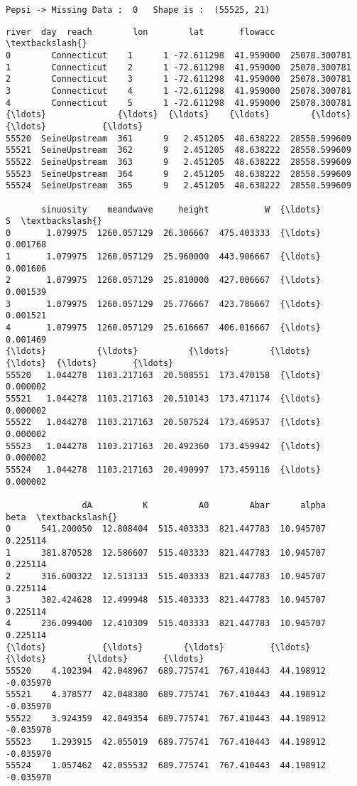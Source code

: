 \documentclass[11pt]{article}
\begin{document}
    \begin{Verbatim}[commandchars=\\\{\}]
Pepsi -> Missing Data :  0   Shape is :  (55525, 21)
    \end{Verbatim}

    
    \begin{Verbatim}[commandchars=\\\{\}]
               river  day  reach        lon        lat       flowacc  \textbackslash{}
0        Connecticut    1      1 -72.611298  41.959000  25078.300781   
1        Connecticut    2      1 -72.611298  41.959000  25078.300781   
2        Connecticut    3      1 -72.611298  41.959000  25078.300781   
3        Connecticut    4      1 -72.611298  41.959000  25078.300781   
4        Connecticut    5      1 -72.611298  41.959000  25078.300781   
{\ldots}              {\ldots}  {\ldots}    {\ldots}        {\ldots}        {\ldots}           {\ldots}   
55520  SeineUpstream  361      9   2.451205  48.638222  28558.599609   
55521  SeineUpstream  362      9   2.451205  48.638222  28558.599609   
55522  SeineUpstream  363      9   2.451205  48.638222  28558.599609   
55523  SeineUpstream  364      9   2.451205  48.638222  28558.599609   
55524  SeineUpstream  365      9   2.451205  48.638222  28558.599609   

       sinuosity    meandwave     height           W  {\ldots}         S  \textbackslash{}
0       1.079975  1260.057129  26.306667  475.403333  {\ldots}  0.001768   
1       1.079975  1260.057129  25.960000  443.906667  {\ldots}  0.001606   
2       1.079975  1260.057129  25.810000  427.006667  {\ldots}  0.001539   
3       1.079975  1260.057129  25.776667  423.786667  {\ldots}  0.001521   
4       1.079975  1260.057129  25.616667  406.016667  {\ldots}  0.001469   
{\ldots}          {\ldots}          {\ldots}        {\ldots}         {\ldots}  {\ldots}       {\ldots}   
55520   1.044278  1103.217163  20.508551  173.470158  {\ldots}  0.000002   
55521   1.044278  1103.217163  20.510143  173.471174  {\ldots}  0.000002   
55522   1.044278  1103.217163  20.507524  173.469537  {\ldots}  0.000002   
55523   1.044278  1103.217163  20.492360  173.459942  {\ldots}  0.000002   
55524   1.044278  1103.217163  20.490997  173.459116  {\ldots}  0.000002   

               dA          K          A0        Abar      alpha      beta  \textbackslash{}
0      541.200050  12.808404  515.403333  821.447783  10.945707  0.225114   
1      381.870528  12.586607  515.403333  821.447783  10.945707  0.225114   
2      316.600322  12.513133  515.403333  821.447783  10.945707  0.225114   
3      302.424628  12.499948  515.403333  821.447783  10.945707  0.225114   
4      236.099400  12.410309  515.403333  821.447783  10.945707  0.225114   
{\ldots}           {\ldots}        {\ldots}         {\ldots}         {\ldots}        {\ldots}       {\ldots}   
55520    4.102394  42.048967  689.775741  767.410443  44.198912 -0.035970   
55521    4.378577  42.048380  689.775741  767.410443  44.198912 -0.035970   
55522    3.924359  42.049354  689.775741  767.410443  44.198912 -0.035970   
55523    1.293915  42.055019  689.775741  767.410443  44.198912 -0.035970   
55524    1.057462  42.055532  689.775741  767.410443  44.198912 -0.035970   


\end{Verbatim}
\end{document}
